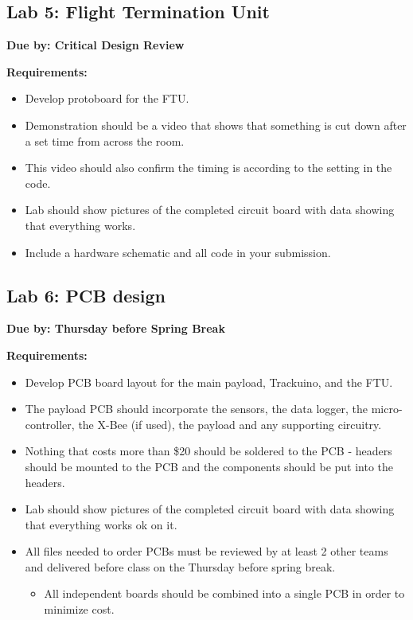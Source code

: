 \documentclass[11pt]{article}
\begin{document}
\subsection{Lab 5: Flight Termination Unit}

{\bf Due by: Critical Design Review}

\noindent
{\bf Requirements:}

\begin{itemize}
    \item Develop protoboard for the FTU.
    \item Demonstration should be a video that shows that something is
      cut down after a set time from across the room.
    \item This video should also confirm the timing is according to
      the setting in the code.
   \item Lab should show pictures of the completed circuit board with
     data showing that everything works.
    \item Include a hardware schematic and all code in your
      submission.
\end{itemize}

\subsection{Lab 6: PCB design}

{\bf Due by: Thursday before Spring Break}

\noindent
{\bf Requirements:}

\begin{itemize}
    \item Develop PCB board layout for the main payload, Trackuino,
      and the FTU.
    \item The payload PCB should incorporate the sensors, the data
      logger, the micro-controller, the X-Bee (if used), the payload
      and any supporting circuitry.
    \item Nothing that costs more than \$20 should be soldered to the
      PCB - headers should be mounted to the PCB and the components
      should be put into the headers.
    \item Lab should show pictures of the completed circuit board with
      data showing that everything works ok on it.
    \item All files needed to order PCBs must be reviewed by at least
      2 other teams and delivered before class on the Thursday before
      spring break.
    \begin{itemize}
        \item All independent boards should be combined into a single
          PCB in order to minimize cost.
    \end{itemize}
\end{itemize}
\end{document}
